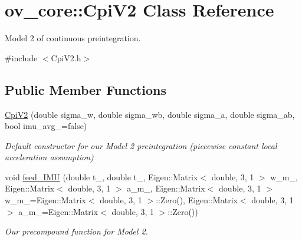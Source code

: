 \hypertarget{classov__core_1_1CpiV2}{}\section{ov\+\_\+core\+:\+:Cpi\+V2 Class Reference}
\label{classov__core_1_1CpiV2}


Model 2 of continuous preintegration.  




{\ttfamily \#include $<$Cpi\+V2.\+h$>$}

\subsection*{Public Member Functions}
\begin{DoxyCompactItemize}
\item 
\hyperlink{classov__core_1_1CpiV2_acc303eae31571a4a132cb8a161b6658b}{Cpi\+V2} (double sigma\+\_\+w, double sigma\+\_\+wb, double sigma\+\_\+a, double sigma\+\_\+ab, bool imu\+\_\+avg\+\_\+=false)
\begin{DoxyCompactList}\small\item\em Default constructor for our Model 2 preintegration (piecewise constant local acceleration assumption) \end{DoxyCompactList}\item 
void \hyperlink{classov__core_1_1CpiV2_a2e526d34b80061293a922fefa3a858a1}{feed\+\_\+\+I\+MU} (double t\+\_, double t\+\_, Eigen\+::\+Matrix$<$ double, 3, 1 $>$ w\+\_\+m\+\_, Eigen\+::\+Matrix$<$ double, 3, 1 $>$ a\+\_\+m\+\_, Eigen\+::\+Matrix$<$ double, 3, 1 $>$ w\+\_\+m\+\_=Eigen\+::\+Matrix$<$ double, 3, 1 $>$\+::Zero(), Eigen\+::\+Matrix$<$ double, 3, 1 $>$ a\+\_\+m\+\_=Eigen\+::\+Matrix$<$ double, 3, 1 $>$\+::Zero())
\begin{DoxyCompactList}\small\item\em Our precompound function for Model 2. \end{DoxyCompactList}\end{DoxyCompactItemize}
